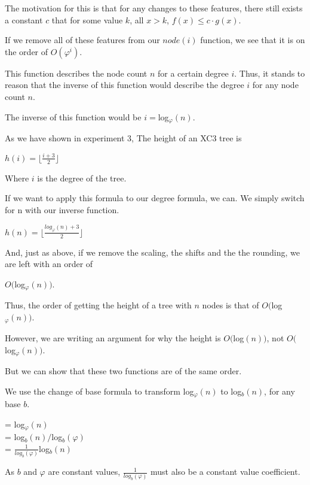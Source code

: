 \documentclass{article}
\begin{document}
The motivation for this is that for any changes to these features, there still exists a constant $c$ that for some value $k$, all $x > k$, $f(x) \leq c \cdot g(x)$.

If we remove all of these features from our $node(i)$ function, we see that it is on the order of $O(\varphi^i)$.

This function describes  the node count $n$ for a certain degree $i$. Thus, it stands to reason that the inverse of this function would describe the degree $i$ for any node count $n$.

The inverse of this function would be $i = $log$_{\varphi}(n)$.

As we have shown in experiment 3, The height of an XC3 tree is
{
\begin{center}
    $h(i) = \lfloor \frac{i+3}{2} \rfloor$\\
    $ $
\end{center}
}
Where $i$ is the degree of the tree.

If we want to apply this formula to our degree formula, we can.
We simply switch for n with our inverse function.
{
\begin{center}
    $h(n) = \lfloor \frac{log_{\varphi}(n)+3}{2} \rfloor$\\
    $ $
\end{center}
}
And, just as above, if we remove the scaling, the shifts and the the rounding, we are left with an order of 
    \begin{center}
    $O($log$_{\varphi}(n))$.
    \end{center}
Thus, the order of getting the height of a tree with $n$ nodes is that of $O($log$_{\varphi}(n))$.

However, we are writing an argument for why the height is $O($log$(n))$, not $O($log$_{\varphi}(n))$.

But we can show that these two functions are of the same order.

We use the change of base formula to transform log$_{\varphi}(n)$ to log$_{b}(n)$, for any base $b$.

\begin{center}
    = log$_{\varphi}(n)$\\
    = log$_{b}(n) / $log$_{b}(\varphi)$\\
    = $\frac{1}{log_{b}(\varphi)}$log$_{b}(n)$\\
\end{center}

As $b$ and $\varphi$ are constant values, $\frac{1}{log_{b}(\varphi)}$ must also be a constant value coefficient.
\end{document}
